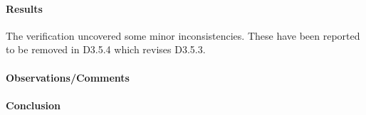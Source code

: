 \paragraph{Results}
The verification uncovered some minor inconsistencies. These have been
reported to be removed in D3.5.4 which revises D3.5.3. 

\paragraph{Observations/Comments}

\paragraph{Conclusion}
